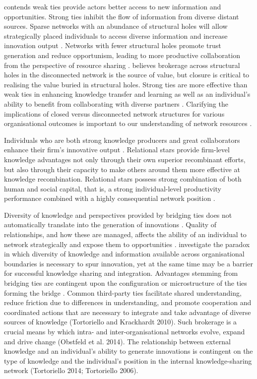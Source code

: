 \citet{granovetter1973strength} contends weak ties provide actors better access to new information and opportunities. Strong ties inhibit the flow of information from diverse distant sources. Sparse networks with an abundance of structural holes will allow strategically placed individuals to access diverse information and increase innovation output \citep{burt2004structural}. Networks with fewer structural holes promote trust generation and reduce opportunism, leading to more productive collaboration from the perspective of resource sharing \citep{ahuja2000collaboration}. \citet{burt2001structural} believes brokerage across structural holes in the disconnected network is the source of value, but closure is critical to realising the value buried in structural holes. Strong ties are more effective than weak ties in enhancing knowledge transfer and learning as well as an individual’s ability to benefit from collaborating with diverse partners \citep{rost2011strength,phelps2012knowledge}. Clarifying the implications of closed versus disconnected network structures for various organisational outcomes is important to our understanding of network resources \citep{ahuja2000collaboration}. \medskip

Individuals who are both strong knowledge producers and great collaborators enhance their firm’s innovative output \citep{grigoriou2014structural}. Relational stars provide firm-level knowledge advantages not only through their own superior recombinant efforts, but also through their capacity to make others around them more effective at knowledge recombination. Relational stars possess strong combination of both human and social capital, that is, a strong individual-level productivity performance combined with a highly consequential network position \citep{grigoriou2014structural}. \medskip
 
Diversity of knowledge and perspectives provided by bridging ties does not automatically translate into the generation of innovations \citep{ahuja2000collaboration}. Quality of relationships, and how these are managed, affects the ability of an individual to network strategically and expose them to opportunities \citep{uzzi1997social}. \citet{tortoriello2010activating} investigate the paradox in which diversity of knowledge and information available across organisational boundaries is necessary to spur innovation, yet at the same time may be a barrier for successful knowledge sharing and integration. Advantages stemming from bridging ties are contingent upon the configuration or microstructure of the ties forming the bridge \citep{tortoriello2010activating,tortoriello2015social}. Common third-party ties facilitate shared understanding, reduce friction due to differences in understanding, and promote cooperation and coordinated actions that are necessary to integrate and take advantage of diverse sources of knowledge (Tortoriello and Krackhardt 2010). Such brokerage is a crucial means by which intra- and inter-organisational networks evolve, expand and drive change (Obstfeld et al. 2014). The relationship between external knowledge and an individual’s ability to generate innovations is contingent on the type of knowledge and the individual’s position in the internal knowledge-sharing network (Tortoriello 2014; Tortoriello 2006). 


